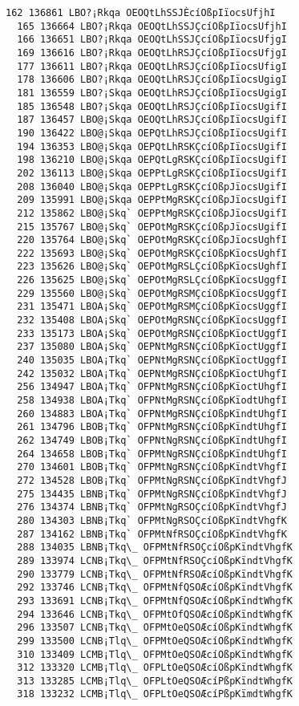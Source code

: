 \documentclass[11pt]{article}
\begin{document}
\begin{Verbatim}[commandchars=\\\{\}]
  162 136861 LBO?¡Rkqa OEOQtLhSSJÈcíOßpIïocsUfjhI
  165 136664 LBO?¡Rkqa OEOQtLhSSJÇcíOßpIïocsUfjhI
  166 136651 LBO?¡Rkqa OEOQtLhSSJÇcíOßpIïocsUfjgI
  169 136616 LBO?¡Rkqa OEOQtLhRSJÇcíOßpIïocsUfjgI
  177 136611 LBO?¡Rkqa OEOQtLhRSJÇcíOßpIïocsUfigI
  178 136606 LBO?¡Rkqa OEOQtLhRSJÇcíOßpIïocsUgigI
  181 136559 LBO?¡Skqa OEOQtLhRSJÇcíOßpIïocsUgigI
  185 136548 LBO?¡Skqa OEOQtLhRSJÇcíOßpIïocsUgifI
  187 136457 LBO@¡Skqa OEOQtLhRSJÇcíOßpIïocsUgifI
  190 136422 LBO@¡Skqa OEPQtLhRSJÇcíOßpIïocsUgifI
  194 136353 LBO@¡Skqa OEPQtLhRSKÇcíOßpIïocsUgifI
  198 136210 LBO@¡Skqa OEPQtLgRSKÇcíOßpIïocsUgifI
  202 136113 LBO@¡Skqa OEPPtLgRSKÇcíOßpIïocsUgifI
  208 136040 LBO@¡Skqa OEPPtLgRSKÇcíOßpJïocsUgifI
  209 135991 LBO@¡Skqa OEPPtMgRSKÇcíOßpJïocsUgifI
  212 135862 LBO@¡Skq` OEPPtMgRSKÇcíOßpJïocsUgifI
  215 135767 LBO@¡Skq` OEPOtMgRSKÇcíOßpJïocsUgifI
  220 135764 LBO@¡Skq` OEPOtMgRSKÇcíOßpJïocsUghfI
  222 135693 LBO@¡Skq` OEPOtMgRSKÇcíOßpKïocsUghfI
  223 135626 LBO@¡Skq` OEPOtMgRSLÇcíOßpKïocsUghfI
  226 135625 LBO@¡Skq` OEPOtMgRSLÇcíOßpKïocsUggfI
  229 135560 LBO@¡Skq` OEPOtMgRSMÇcíOßpKïocsUggfI
  231 135471 LBOA¡Skq` OEPOtMgRSMÇcíOßpKïocsUggfI
  232 135408 LBOA¡Skq` OEPOtMgRSNÇcíOßpKïocsUggfI
  233 135173 LBOA¡Skq` OEPOtMgRSNÇcíOßpKïoctUggfI
  237 135080 LBOA¡Skq` OEPNtMgRSNÇcíOßpKïoctUggfI
  240 135035 LBOA¡Tkq` OEPNtMgRSNÇcíOßpKïoctUggfI
  242 135032 LBOA¡Tkq` OEPNtMgRSNÇcíOßpKïoctUhgfI
  256 134947 LBOA¡Tkq` OFPNtMgRSNÇcíOßpKïoctUhgfI
  258 134938 LBOA¡Tkq` OFPNtMgRSNÇcíOßpKïodtUhgfI
  260 134883 LBOA¡Tkq` OFPNtMgRSNÇcíOßpKïndtUhgfI
  261 134796 LBOB¡Tkq` OFPNtMgRSNÇcíOßpKïndtUhgfI
  262 134749 LBOB¡Tkq` OFPNtNgRSNÇcíOßpKïndtUhgfI
  264 134658 LBOB¡Tkq` OFPMtNgRSNÇcíOßpKïndtUhgfI
  270 134601 LBOB¡Tkq` OFPMtNgRSNÇcíOßpKïndtVhgfI
  272 134528 LBOB¡Tkq` OFPMtNgRSNÇcíOßpKïndtVhgfJ
  275 134435 LBNB¡Tkq` OFPMtNgRSNÇcíOßpKïndtVhgfJ
  276 134374 LBNB¡Tkq` OFPMtNgRSOÇcíOßpKïndtVhgfJ
  280 134303 LBNB¡Tkq` OFPMtNgRSOÇcíOßpKïndtVhgfK
  287 134162 LBNB¡Tkq` OFPMtNfRSOÇcíOßpKïndtVhgfK
  288 134035 LBNB¡Tkq\_ OFPMtNfRSOÇcíOßpKïndtVhgfK
  289 133974 LCNB¡Tkq\_ OFPMtNfRSOÇcíOßpKïndtVhgfK
  290 133779 LCNB¡Tkq\_ OFPMtNfRSOÆcíOßpKïndtVhgfK
  292 133746 LCNB¡Tkq\_ OFPMtNfQSOÆcíOßpKïndtVhgfK
  293 133691 LCNB¡Tkq\_ OFPMtNfQSOÆcíOßpKïndtWhgfK
  294 133646 LCNB¡Tkq\_ OFPMtOfQSOÆcíOßpKïndtWhgfK
  296 133507 LCNB¡Tkq\_ OFPMtOeQSOÆcíOßpKïndtWhgfK
  299 133500 LCNB¡Tlq\_ OFPMtOeQSOÆcíOßpKïndtWhgfK
  310 133409 LCMB¡Tlq\_ OFPMtOeQSOÆcíOßpKïndtWhgfK
  312 133320 LCMB¡Tlq\_ OFPLtOeQSOÆcíOßpKïndtWhgfK
  313 133285 LCMB¡Tlq\_ OFPLtOeQSOÆcíPßpKïndtWhgfK
  318 133232 LCMB¡Tlq\_ OFPLtOeQSOÆcíPßpKïmdtWhgfK

\end{Verbatim}
\end{document}
